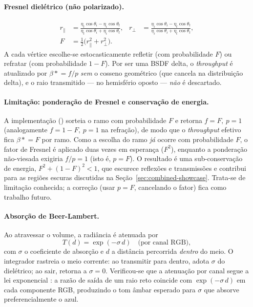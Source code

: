 \documentclass[portuguese]{sbcreviews-2025}%
\makeatletter
\newcommand{\pbrtcontentsurl}{https://pbr-book.org/4ed/contents.html}
\newcommand{\pbrtsectionurl}[1]{%
    \ifcsname pbrturl@#1\endcsname
        \csname pbrturl@#1\endcsname
    \else
        \pbrtcontentsurl
    \fi
}
\newcommand{\pbrtsec}[1]{\citep[\href{\pbrtsectionurl{#1}}{Se\c{c}\~ao~#1}]{pharr2023pbrt}}
\makeatother
\begin{document}
\paragraph{Fresnel dielétrico (não polarizado).}
\begin{align}
r_\parallel &= \frac{\eta_t\cos\theta_i-\eta_i\cos\theta_t}{\eta_t\cos\theta_i+\eta_i\cos\theta_t}, &
r_\perp &= \frac{\eta_i\cos\theta_i-\eta_t\cos\theta_t}{\eta_i\cos\theta_i+\eta_t\cos\theta_t}, \label{eq:fresnel-r}\\
F &= \tfrac{1}{2}\big(r_\parallel^2+r_\perp^2\big). \label{eq:fresnel-F}
\end{align}
A cada vértice escolhe-se estocasticamente refletir (com probabilidade $F$) ou refratar (com
probabilidade $1-F$). Por ser uma BSDF delta, o \emph{throughput} é atualizado por
$\beta\mathrel{\ast}=f/p$ \emph{sem} o cosseno geométrico (que cancela na distribuição delta), e
o raio transmitido — no hemisfério oposto — \emph{não} é descartado.

\paragraph{Limitação: ponderação de Fresnel e conservação de energia.} A implementação
() sorteia o ramo com probabilidade $F$ e retorna
$f=F,\ p=1$ (analogamente $f=1-F,\ p=1$ na refração), de modo que o \emph{throughput} efetivo
fica $\beta\mathrel{\ast}=F$ por ramo. Como a escolha do ramo \emph{já} ocorre com probabilidade
$F$, o fator de Fresnel é aplicado duas vezes em esperança ($F^2$), enquanto a ponderação
não-viesada exigiria $f/p=1$ (isto é, $p=F$). O resultado é uma sub-conservação de energia,
$F^2+(1-F)^2<1$, que escurece reflexões e transmissões e contribui para as regiões escuras
discutidas na Seção~\ref{sec:combined-showcase}. Trata-se de limitação conhecida; a correção
(usar $p=F$, cancelando o fator) fica como trabalho futuro.

\paragraph{Absorção de Beer-Lambert.} Ao atravessar o volume, a radiância é atenuada por
\pbrtsec{11.2}
\begin{equation}
T(d) = \exp(-\sigma\,d) \quad\text{(por canal RGB)},
\end{equation}
com $\sigma$ o coeficiente de absorção e $d$ a distância percorrida \emph{dentro} do meio. O
integrador rastreia o meio corrente: ao transmitir para dentro, adota $\sigma$ do dielétrico;
ao sair, retorna a $\sigma=0$. Verificou-se que a atenuação por canal segue a lei exponencial
\pbrtsec{11.2}: a razão de saída de um raio reto coincide com $\exp(-\sigma\,d)$ em cada
componente RGB, produzindo o tom âmbar esperado para $\sigma$ que absorve preferencialmente o
azul.
\end{document}

